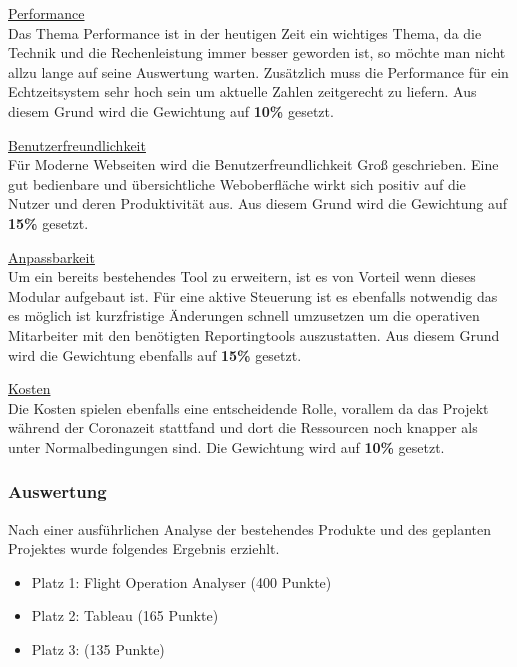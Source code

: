 		\vspace{8pt}

		{
			\noindent
			\underline{Performance}\\
			Das Thema Performance ist in der heutigen Zeit ein wichtiges Thema, da die Technik und die Rechenleistung immer besser geworden ist, so möchte man nicht allzu lange auf seine Auswertung warten. Zusätzlich muss die Performance für ein Echtzeitsystem sehr hoch sein um aktuelle Zahlen zeitgerecht zu liefern. Aus diesem Grund wird die Gewichtung auf \textbf{10\%} gesetzt.
		}

		\vspace{8pt}

		{
			\noindent
			\underline{Benutzerfreundlichkeit}\\
			Für Moderne Webseiten wird die Benutzerfreundlichkeit Groß geschrieben. Eine gut bedienbare und übersichtliche Weboberfläche wirkt sich positiv auf die Nutzer und deren Produktivität aus. Aus diesem Grund wird die Gewichtung auf \textbf{15\%} gesetzt.
		}

		\vspace{8pt}

		{
			\noindent
			\underline{Anpassbarkeit}\\
			Um ein bereits bestehendes Tool zu erweitern, ist es von Vorteil wenn dieses Modular aufgebaut ist. Für eine aktive Steuerung ist es ebenfalls notwendig das es möglich ist kurzfristige Änderungen schnell umzusetzen um die operativen Mitarbeiter mit den benötigten Reportingtools auszustatten. Aus diesem Grund wird die Gewichtung ebenfalls auf \textbf{15\%} gesetzt.
		}

		\vspace{8pt}

		{
			\noindent
			\underline{Kosten}\\
			Die Kosten spielen ebenfalls eine entscheidende Rolle, vorallem da das Projekt während der Coronazeit stattfand und dort die Ressourcen noch knapper als unter Normalbedingungen sind. Die Gewichtung wird auf \textbf{10\%} gesetzt.
		}

		\subsubsection{Auswertung}
		Nach einer ausführlichen Analyse der bestehendes Produkte und des geplanten Projektes wurde folgendes Ergebnis erziehlt.

		\begin{itemize}
			\item Platz 1: Flight Operation Analyser (400 Punkte)
			\item Platz 2: Tableau (165 Punkte)
			\item Platz 3:  (135 Punkte)
		\end{itemize}

